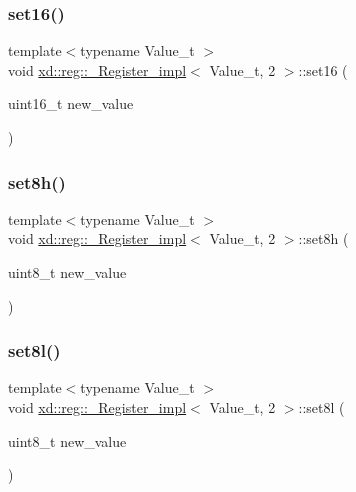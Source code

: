 \subsubsection{\texorpdfstring{set16()}{set16()}}
{\footnotesize\ttfamily template$<$typename Value\+\_\+t $>$ \\
void \mbox{\hyperlink{classxd_1_1reg_1_1___register__impl}{xd\+::reg\+::\+\_\+\+Register\+\_\+impl}}$<$ Value\+\_\+t, 2 $>$\+::set16 (\begin{DoxyParamCaption}\item[{uint16\+\_\+t}]{new\+\_\+value }\end{DoxyParamCaption})\hspace{0.3cm}{\ttfamily [inline]}}

\mbox{\label{classxd_1_1reg_1_1___register__impl_3_01_value__t_00_012_01_4_afe4f8dbdf1c6f3a58c1477b15f2d11d4}} 
\subsubsection{\texorpdfstring{set8h()}{set8h()}}
{\footnotesize\ttfamily template$<$typename Value\+\_\+t $>$ \\
void \mbox{\hyperlink{classxd_1_1reg_1_1___register__impl}{xd\+::reg\+::\+\_\+\+Register\+\_\+impl}}$<$ Value\+\_\+t, 2 $>$\+::set8h (\begin{DoxyParamCaption}\item[{uint8\+\_\+t}]{new\+\_\+value }\end{DoxyParamCaption})\hspace{0.3cm}{\ttfamily [inline]}}

\mbox{\label{classxd_1_1reg_1_1___register__impl_3_01_value__t_00_012_01_4_ae6b2ae9e60cc0971d58dca0a56b8cf93}} 
\subsubsection{\texorpdfstring{set8l()}{set8l()}}
{\footnotesize\ttfamily template$<$typename Value\+\_\+t $>$ \\
void \mbox{\hyperlink{classxd_1_1reg_1_1___register__impl}{xd\+::reg\+::\+\_\+\+Register\+\_\+impl}}$<$ Value\+\_\+t, 2 $>$\+::set8l (\begin{DoxyParamCaption}\item[{uint8\+\_\+t}]{new\+\_\+value }\end{DoxyParamCaption})\hspace{0.3cm}{\ttfamily [inline]}}



